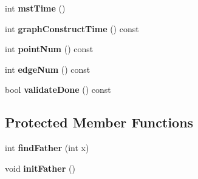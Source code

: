 \begin{DoxyCompactItemize}
\item 
int {\bfseries mst\+Time} ()\hypertarget{classcmst_1_1_graph2_d_a3b596946f310f7024036d2c6a18985a3}{}\label{classcmst_1_1_graph2_d_a3b596946f310f7024036d2c6a18985a3}

\item 
int {\bfseries graph\+Construct\+Time} () const \hypertarget{classcmst_1_1_graph2_d_ad4756aa3f617493bd8b3f6ecfe099449}{}\label{classcmst_1_1_graph2_d_ad4756aa3f617493bd8b3f6ecfe099449}

\item 
int {\bfseries point\+Num} () const \hypertarget{classcmst_1_1_graph2_d_a0b18b38d5813b2fdbe8f5a8d6f92575d}{}\label{classcmst_1_1_graph2_d_a0b18b38d5813b2fdbe8f5a8d6f92575d}

\item 
int {\bfseries edge\+Num} () const \hypertarget{classcmst_1_1_graph2_d_ae2474e4dd9964cd18fc9926a296c82fd}{}\label{classcmst_1_1_graph2_d_ae2474e4dd9964cd18fc9926a296c82fd}

\item 
bool {\bfseries validate\+Done} () const \hypertarget{classcmst_1_1_graph2_d_ab7fbcf59b9ef4e9cc10015fd610cb4fc}{}\label{classcmst_1_1_graph2_d_ab7fbcf59b9ef4e9cc10015fd610cb4fc}

\end{DoxyCompactItemize}
\subsection*{Protected Member Functions}
\begin{DoxyCompactItemize}
\item 
int {\bfseries find\+Father} (int x)\hypertarget{classcmst_1_1_graph2_d_a0b860daa24f288eea5f490e12fcb67e2}{}\label{classcmst_1_1_graph2_d_a0b860daa24f288eea5f490e12fcb67e2}

\item 
void {\bfseries init\+Father} ()\hypertarget{classcmst_1_1_graph2_d_a5de76dfe02b4a13e0d3fe9a5e7ea7285}{}\label{classcmst_1_1_graph2_d_a5de76dfe02b4a13e0d3fe9a5e7ea7285}

\end{DoxyCompactItemize}
